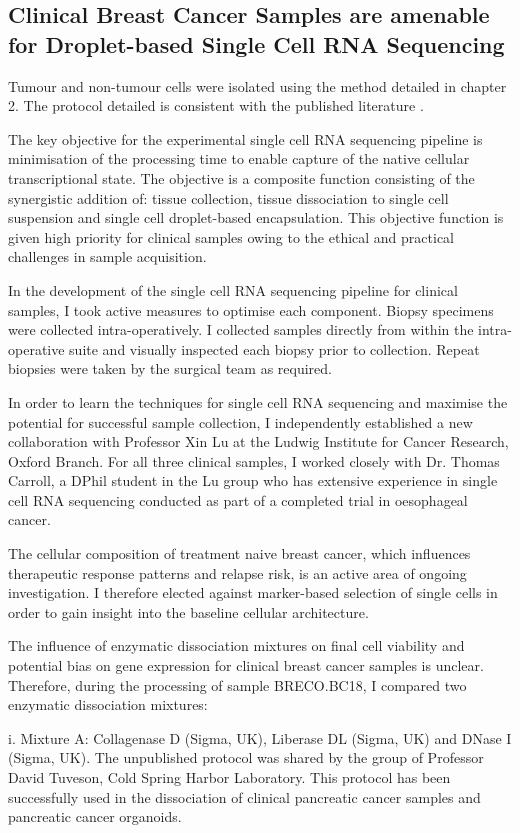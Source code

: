 \subsection{Clinical Breast Cancer Samples are amenable for Droplet-based Single Cell RNA Sequencing}
Tumour and non-tumour cells were isolated using the method detailed in chapter 2. The protocol detailed is consistent with the published literature \cite{Bassez2021}.

The key objective for the experimental single cell RNA sequencing pipeline is minimisation of the processing time to enable capture of the native cellular transcriptional state. The objective is a composite function consisting of the synergistic addition of: tissue collection, tissue dissociation to single cell suspension and single cell droplet-based encapsulation. This objective function is given high priority for clinical samples owing to the ethical and practical challenges in sample acquisition.

In the development of the single cell RNA sequencing pipeline for clinical samples, I took active measures to optimise each component. Biopsy specimens were collected intra-operatively. I collected samples directly from within the intra-operative suite and visually inspected each biopsy prior to collection. Repeat biopsies were taken by the surgical team as required.

In order to learn the techniques for single cell RNA sequencing and maximise the potential for successful sample collection, I independently established a new collaboration with Professor Xin Lu at the Ludwig Institute for Cancer Research, Oxford Branch. For all three clinical samples, I worked closely with Dr. Thomas Carroll, a DPhil student in the Lu group who has extensive experience in single cell RNA sequencing conducted as part of a completed trial in oesophageal cancer.

The cellular composition of treatment naive breast cancer, which influences therapeutic response patterns and relapse risk, is an active area of ongoing investigation. I therefore elected against marker-based selection of single cells in order to gain insight into the baseline cellular architecture.

The influence of enzymatic dissociation mixtures on final cell viability and potential bias on gene expression for clinical breast cancer samples is unclear. Therefore, during the processing of sample BRECO.BC18, I compared two enzymatic dissociation mixtures:

i. Mixture A: Collagenase D (Sigma, UK), Liberase DL (Sigma, UK) and DNase I (Sigma, UK). The unpublished protocol was shared by the group of Professor David Tuveson, Cold Spring Harbor Laboratory. This protocol has been successfully used in the dissociation of clinical pancreatic cancer samples and pancreatic cancer organoids.

